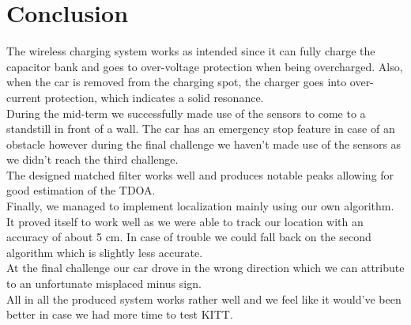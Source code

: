\documentclass[final]{scrreprt} %
\begin{document}
\chapter{Conclusion}

The wireless charging system works as intended since it can fully charge the capacitor bank and goes to over-voltage protection when being overcharged.
Also, when the car is removed from the charging spot, the charger goes into over-current protection, which indicates a solid resonance.\\
During the mid-term we successfully made use of the sensors to come to a standstill in front of a wall.
The car has an emergency stop feature in case of an obstacle however during the final challenge we haven't made use of the sensors as we didn't reach the third challenge.\\
The designed matched filter works well and produces notable peaks allowing for good estimation of the TDOA.\\
Finally, we managed to implement localization mainly using our own algorithm.
It proved itself to work well as we were able to track our location with an accuracy of about 5 cm.
In case of trouble we could fall back on the second algorithm which is slightly less accurate.\\
At the final challenge our car drove in the wrong direction which we can attribute to an unfortunate misplaced minus sign.\\
All in all the produced system works rather well and we feel like it would've been better in case we had more time to test KITT.
\end{document}
